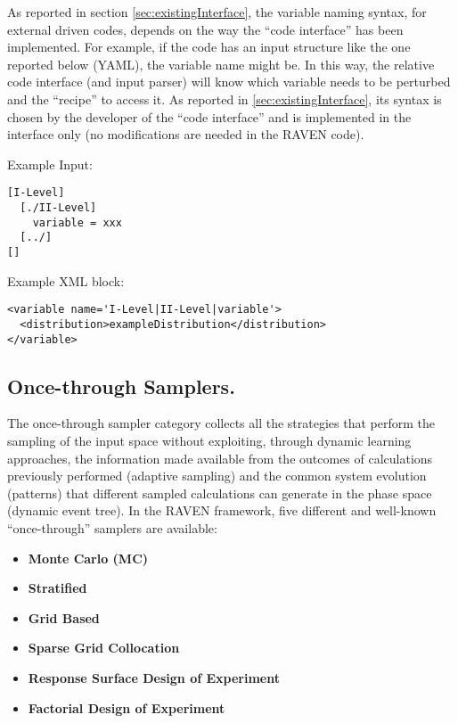 As reported in section \ref{sec:existingInterface}, the variable naming syntax,
for external driven codes, depends on the way the ``code interface'' has been
implemented.
%
For example, if the code has an input structure like the one reported below (YAML), the
variable name might be.
%
In this way, the relative code interface (and input parser) will know which
variable needs to be perturbed and the ``recipe'' to access it.
%
As reported in \ref{sec:existingInterface}, its syntax is chosen by the
developer of the ``code interface'' and is implemented in the interface only
(no modifications are needed in the RAVEN code).


Example Input:
\begin{lstlisting}
[I-Level]
  [./II-Level]
    variable = xxx
  [../]
[]
\end{lstlisting}

Example XML block:
\begin{lstlisting}[style=XML]
<variable name='I-Level|II-Level|variable'>
  <distribution>exampleDistribution</distribution>
</variable>
\end{lstlisting}

\subsection{Once-through Samplers.}
\label{subsec:onceThroughSamplers}
The once-through sampler category collects all the strategies that perform the
sampling of the input space without exploiting, through dynamic learning
approaches, the information made available from the outcomes of calculations
previously performed (adaptive sampling) and the common system evolution
(patterns) that different sampled calculations can generate in the phase space
(dynamic event tree).
%
In the RAVEN framework, five different and well-known “once-through” samplers
are available:
\begin{itemize}
\item \textbf{Monte Carlo (MC)}
\item \textbf{Stratified}
\item \textbf{Grid Based}
\item \textbf{Sparse Grid Collocation}
\item \textbf{Response Surface Design of Experiment}
\item \textbf{Factorial Design of Experiment}
\end{itemize}

